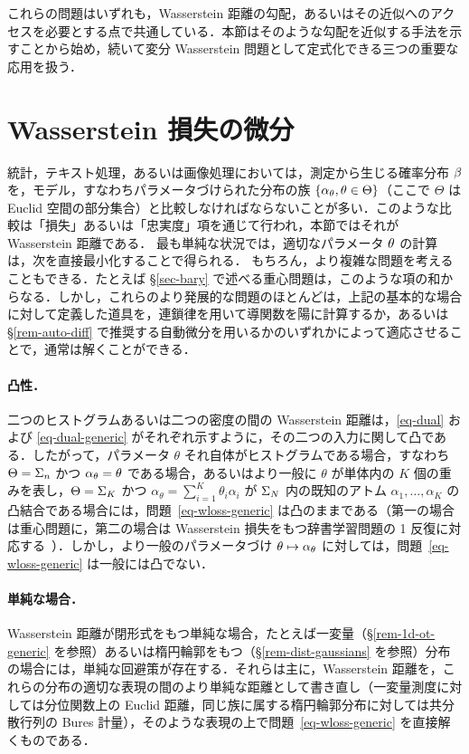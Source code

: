 これらの問題はいずれも，Wasserstein 距離の勾配，あるいはその近似へのアクセスを必要とする点で共通している．本節はそのような勾配を近似する手法を示すことから始め，続いて変分 Wasserstein 問題として定式化できる三つの重要な応用を扱う．

\section{Wasserstein 損失の微分}

統計，テキスト処理，あるいは画像処理においては，測定から生じる確率分布 $\beta$ を，モデル，すなわちパラメータづけられた分布の族 $\{\alpha_\theta,\theta\in\Theta\}$（ここで $\Theta$ は Euclid 空間の部分集合）と比較しなければならないことが多い．このような比較は「損失」あるいは「忠実度」項を通じて行われ，本節ではそれが Wasserstein 距離である．
%
最も単純な状況では，適切なパラメータ $\theta$ の計算は，次を直接最小化することで得られる．
もちろん，より複雑な問題を考えることもできる．たとえば \S\ref{sec-bary} で述べる重心問題は，このような項の和からなる．しかし，これらのより発展的な問題のほとんどは，上記の基本的な場合に対して定義した道具を，連鎖律を用いて導関数を陽に計算するか，あるいは \S\ref{rem-auto-diff} で推奨する自動微分を用いるかのいずれかによって適応させることで，通常は解くことができる．

\paragraph{凸性．} 二つのヒストグラムあるいは二つの密度の間の Wasserstein 距離は，\eqref{eq-dual} および \eqref{eq-dual-generic} がそれぞれ示すように，その二つの入力に関して凸である．したがって，パラメータ $\theta$ それ自体がヒストグラムである場合，すなわち $\Theta=\Sigma_n$ かつ $\alpha_\theta=\theta$ である場合，あるいはより一般に $\theta$ が単体内の $K$ 個の重みを表し，$\Theta=\Sigma_K$ かつ $\alpha_\theta=\sum_{i=1}^K \theta_i \alpha_i$ が $\Sigma_N$ 内の既知のアトム $\alpha_1,\dots,\alpha_K$ の凸結合である場合には，問題~\eqref{eq-wloss-generic} は凸のままである（第一の場合は重心問題に，第二の場合は Wasserstein 損失をもつ辞書学習問題の 1 反復に対応する~\citep{pmlr-v51-rolet16}）．しかし，より一般のパラメータづけ $\theta\mapsto \alpha_\theta$ に対しては，問題~\eqref{eq-wloss-generic} は一般には凸でない．


\paragraph{単純な場合．} Wasserstein 距離が閉形式をもつ単純な場合，たとえば一変量（\S\ref{rem-1d-ot-generic} を参照）あるいは楕円輪郭をもつ（\S\ref{rem-dist-gaussians} を参照）分布の場合には，単純な回避策が存在する．それらは主に，Wasserstein 距離を，これらの分布の適切な表現の間のより単純な距離として書き直し（一変量測度に対しては分位関数上の Euclid 距離，同じ族に属する楕円輪郭分布に対しては共分散行列の Bures 計量），そのような表現の上で問題~\eqref{eq-wloss-generic} を直接解くものである．

